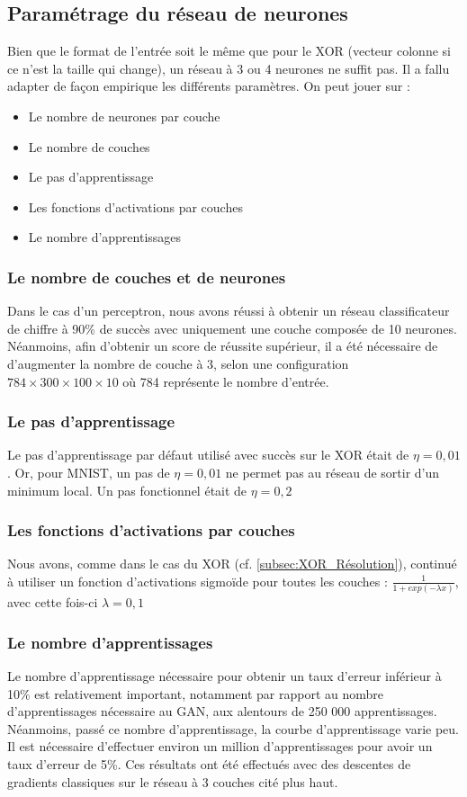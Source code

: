 \subsection{Paramétrage du réseau de neurones}
Bien que le format de l'entrée soit le même que pour le XOR (vecteur colonne si ce n'est la taille qui change), un réseau à 3 ou 4 neurones ne suffit pas. Il a fallu adapter de façon empirique les différents paramètres. On peut jouer sur :
\begin{itemize}
  \item Le nombre de neurones par couche
  \item Le nombre de couches
  \item Le pas d'apprentissage
  \item Les fonctions d'activations par couches
  \item Le nombre d'apprentissages
\end{itemize}
\subsubsection{Le nombre de couches et de neurones}
Dans le cas d'un perceptron, nous avons réussi à obtenir un réseau classificateur de chiffre à 90\% de succès avec uniquement une couche composée de 10 neurones. Néanmoins, afin d'obtenir un score de réussite supérieur, il a été nécessaire de d'augmenter la nombre de couche à 3, selon une configuration $784\times300\times100\times10$ où 784 représente le nombre d'entrée.
\subsubsection{Le pas d'apprentissage}
Le pas d'apprentissage par défaut utilisé avec succès sur le XOR était de $\eta=0,01$. Or, pour MNIST, un pas de $\eta=0,01$ ne permet pas au réseau de sortir d'un minimum local. Un pas fonctionnel était de $\eta=0,2$
\subsubsection{Les fonctions d'activations par couches}
Nous avons, comme dans le cas du XOR (cf. \ref{subsec:XOR_Résolution}), continué à utiliser un fonction d'activations sigmoïde pour toutes les couches : $\frac{1}{1+exp(-\lambda x)}$, avec cette fois-ci $\lambda=0,1$
\subsubsection{Le nombre d'apprentissages}
Le nombre d'apprentissage nécessaire pour obtenir un taux d'erreur inférieur à 10\% est relativement important, notamment par rapport au nombre d'apprentissages nécessaire au GAN, aux alentours de 250 000 apprentissages. Néanmoins, passé ce nombre d'apprentissage, la courbe d'apprentissage varie peu. Il est nécessaire d'effectuer environ un million d'apprentissages pour avoir un taux d'erreur de 5\%. Ces résultats ont été effectués avec des descentes de gradients classiques sur le réseau à 3 couches cité plus haut.
